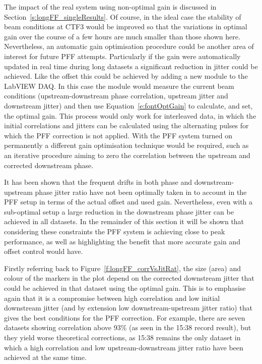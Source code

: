 The impact of the real system using non-optimal gain is discussed in Section~\ref{s:longFF_singleResults}. Of course, in the ideal case the stability of beam conditions at CTF3 would be improved so that the variations in optimal gain over the course of a few hours are much smaller than those shown here. Nevertheless, an automatic gain optimisation procedure could be another area of interest for future PFF attempts. Particularly if the gain were automatically updated in real time during long datasets a significant reduction in jitter could be achieved. Like the offset this could be achieved by adding a new module to the LabVIEW DAQ. In this case the module would measure the current beam conditions (upstream-downstream phase correlation, upstream jitter and downstream jitter) and then use Equation~\ref{e:fontOptGain} to calculate, and set, the optimal gain. This process would only work for interleaved data, in which the initial correlations and jitters can be calculated using the alternating pulses for which the PFF correction is not applied. With the PFF system turned on permanently a different gain optimisation technique would be required, such as an iterative procedure aiming to zero the correlation between the upstream and corrected downstream phase.


It has been shown that the frequent drifts in both phase and downstream-upstream phase jitter ratio have not been optimally taken in to account in the PFF setup in terms of the actual offset and used gain. Nevertheless, even with a sub-optimal setup a large reduction in the downstream phase jitter can be achieved in all datasets. In the remainder of this section it will be shown that considering these constraints the PFF system is achieving close to peak performance, as well as highlighting the benefit that more accurate gain and offset control would have.

Firstly referring back to Figure~\ref{f:longFF_corrVsJitRat}, the size (area) and colour of the markers in the plot depend on the corrected downstream jitter that could be achieved in that dataset using the optimal gain. This is to emphasise again that it is a compromise between high correlation and low initial downstream jitter (and by extension low downstream-upstream jitter ratio) that gives the best conditions for the PFF correction. For example, there are seven datasets showing correlation above 93\% (as seen in the 15:38 record result), but they yield worse theoretical corrections, as 15:38 remains the only dataset in which a high correlation and low upstream-downstream jitter ratio have been achieved at the same time.


